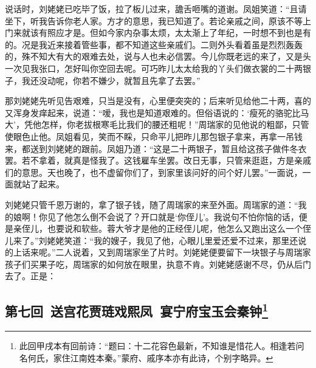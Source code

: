 \par 说话时，刘姥姥已吃毕了饭，拉了板儿过来，舚舌咂嘴的道谢。凤姐笑道：“且请坐下，听我告诉你老人家。方才的意思，我已知道了。若论亲戚之间，原该不等上门来就该有照应才是。但如今家内杂事太烦，太太渐上了年纪，一时想不到也是有的。况是我近来接着管些事，都不知道这些亲戚们。二则外头看着虽是烈烈轰轰的，殊不知大有大的艰难去处，说与人也未必信罢。今儿你既老远的来了，又是头一次见我张口，怎好叫你空回去呢。可巧昨儿太太给我的丫头们做衣裳的二十两银子，我还没动呢，你若不嫌少，就暂且先拿了去罢。”
\par 那刘姥姥先听见告艰难，只当是没有，心里便突突的；后来听见给他二十两，喜的又浑身发痒起来，说道：“嗳，我也是知道艰难的。但俗语说的：‘瘦死的骆驼比马大’，凭他怎样，你老拔根寒毛比我们的腰还粗呢！”周瑞家的见他说的粗鄙，只管使眼色止他。凤姐看见，笑而不睬，只命平儿把昨儿那包银子拿来，再拿一吊钱来，都送到刘姥姥的跟前。凤姐乃道：“这是二十两银子，暂且给这孩子做件冬衣罢。若不拿着，就真是怪我了。这钱雇车坐罢。改日无事，只管来逛逛，方是亲戚们的意思。天也晚了，也不虚留你们了，到家里该问好的问个好儿罢。”一面说，一面就站了起来。
\par 刘姥姥只管千恩万谢的，拿了银子钱，随了周瑞家的来至外面。周瑞家的道：“我的娘啊！你见了他怎么倒不会说了？开口就是‘你侄儿’。我说句不怕你恼的话，便是亲侄儿，也要说和软些。蓉大爷才是他的正经侄儿呢，他怎么又跑出这么一个侄儿来了。”刘姥姥笑道：“我的嫂子，我见了他，心眼儿里爱还爱不过来，那里还说的上话来呢。”二人说着，又到周瑞家坐了片时。刘姥姥便要留下一块银子与周瑞家孩子们买果子吃，周瑞家的如何放在眼里，执意不肯。刘姥姥感谢不尽，仍从后门去了。正是：

\clearpage
\subsection*{第七回\ 送宫花贾琏戏熙凤\ 宴宁府宝玉会秦钟\footnote{此回甲戌本有回前诗：“题曰：十二花容色最新，不知谁是惜花人。相逢若问名何氏，家住江南姓本秦。”蒙府、戚序本亦有此诗，个别字略异。}}


